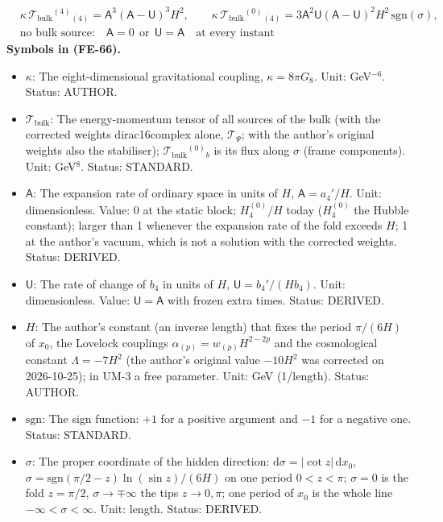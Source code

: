\documentclass[
  10pt,
]{article}
\providecommand{\tightlist}{%
  \setlength{\itemsep}{0pt}\setlength{\parskip}{0pt}}
\begin{document}
\[
\begin{aligned}
&\kappa\,\mathcal{T}_{\mathrm{bulk}}{}^{(4)}{}_{(4)} = \mathsf{A}^3(\mathsf{A} - \mathsf{U})^3H^2,\qquad
 \kappa\,\mathcal{T}_{\mathrm{bulk}}{}^{(0)}{}_{(4)} = 3\mathsf{A}^2\mathsf{U}(\mathsf{A} - \mathsf{U})^2H^2\,\mathrm{sgn}(\sigma),\\
&\text{no bulk source:}\quad \mathsf{A} = 0\ \ \text{or}\ \ \mathsf{U} = \mathsf{A}\quad\text{at every instant}
\end{aligned} \tag{FE-66}
\] \textbf{Symbols in (FE-66).}

\begin{itemize}
\tightlist
\item
  \(\kappa\): The eight-dimensional gravitational coupling,
  \(\kappa = 8\pi G_8\). Unit: GeV\(^{-6}\). Status: AUTHOR.
\item
  \(\mathcal{T}_{\mathrm{bulk}}\): The energy-momentum tensor of all
  sources of the bulk (with the corrected weights dirac16complex alone,
  \(\mathcal{T}_\Psi\); with the author's original weights also the
  stabiliser); \(\mathcal{T}_{\mathrm{bulk}}{}^{(0)}{}_b\) is its flux
  along \(\sigma\) (frame components). Unit: GeV\(^8\). Status:
  STANDARD.
\item
  \(\mathsf{A}\): The expansion rate of ordinary space in units of
  \(H\), \(\mathsf{A} = a_4'/H\). Unit: dimensionless. Value: 0 at the
  static block; \(H_4^{(0)}/H\) today (\(H_4^{(0)}\) the Hubble
  constant); larger than 1 whenever the expansion rate of the fold
  exceeds \(H\); 1 at the author's vacuum, which is not a solution with
  the corrected weights. Status: DERIVED.
\item
  \(\mathsf{U}\): The rate of change of \(b_4\) in units of \(H\),
  \(\mathsf{U} = b_4'/(Hb_4)\). Unit: dimensionless. Value:
  \(\mathsf{U} = \mathsf{A}\) with frozen extra times. Status: DERIVED.
\item
  \(H\): The author's constant (an inverse length) that fixes the period
  \(\pi/(6H)\) of \(x_0\), the Lovelock couplings
  \(\alpha_{(p)} = w_{(p)}H^{2-2p}\) and the cosmological constant
  \(\Lambda = -7H^2\) (the author's original value \(-10H^2\) was
  corrected on 2026-10-25); in UM-3 a free parameter. Unit: GeV
  (1/length). Status: AUTHOR.
\item
  \(\mathrm{sgn}\): The sign function: \(+1\) for a positive argument
  and \(-1\) for a negative one. Status: STANDARD.
\item
  \(\sigma\): The proper coordinate of the hidden direction:
  \(\mathrm{d}\sigma = \lvert\cot z\rvert\,\mathrm{d}x_0\),
  \(\sigma = \mathrm{sgn}(\pi/2 - z)\ln(\sin z)/(6H)\) on one period
  \(0 < z < \pi\); \(\sigma = 0\) is the fold \(z = \pi/2\),
  \(\sigma \to \mp\infty\) the tips \(z \to 0, \pi\); one period of
  \(x_0\) is the whole line \(-\infty < \sigma < \infty\). Unit: length.
  Status: DERIVED.
\end{itemize}
\end{document}
